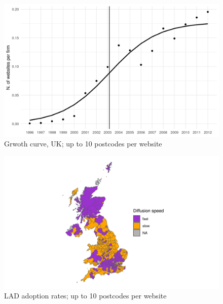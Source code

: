 \documentclass[
  authoryear,
  preprint,
  3p]{elsarticle}
\begin{document}

\begin{figure}[H]

{\centering \includegraphics[width=1\textwidth,height=\textheight]{../../outputs/s/s_uk_per_firm.png}

}

\caption{\label{s_uk10}Grwoth curve, UK; up to 10 postcodes per website}

\end{figure}%

\begin{figure}[H]

{\centering \includegraphics[width=1\textwidth,height=\textheight]{../../outputs/s/speed_map_10.png}

}

\caption{\label{s_map10}LAD adoption rates; up to 10 postcodes per
website}

\end{figure}%
\end{document}
